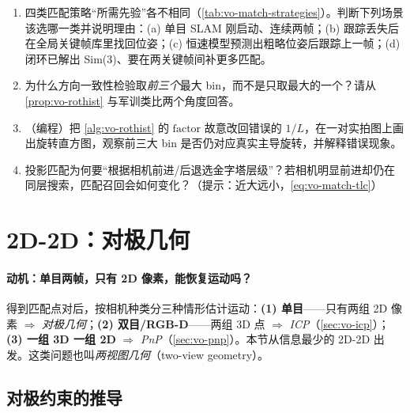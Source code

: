 \begin{practice}
\begin{enumerate}
  \item 四类匹配策略“所需先验”各不相同（\cref{tab:vo-match-strategies}）。判断下列场景该选哪一类并说明理由：(a) 单目 SLAM 刚启动、连续两帧；(b) 跟踪丢失后在全局关键帧库里找回位姿；(c) 恒速模型预测出粗略位姿后跟踪上一帧；(d) 闭环已解出 Sim(3)、要在两关键帧间补更多匹配。
  \item 为什么方向一致性检验取\emph{前三个}最大 bin，而不是只取最大的一个？请从 \cref{prop:vo-rothist} 与军训类比两个角度回答。
  \item （编程）把 \cref{alg:vo-rothist} 的 $\mathrm{factor}$ 故意改回错误的 $1/L$，在一对实拍图上画出旋转直方图，观察前三大 bin 是否仍对应真实主导旋转，并解释错误现象。
  \item 投影匹配为何要“根据相机前进/后退选金字塔层级”？若相机明显前进却仍在同层搜索，匹配召回会如何变化？（提示：近大远小，\cref{eq:vo-match-tlc}）
\end{enumerate}
\end{practice}

\section{2D-2D：对极几何}
\label{sec:vo-epipolar}

\paragraph{动机：单目两帧，只有 2D 像素，能恢复运动吗？}
得到匹配点对后，按相机种类分三种情形估计运动\cite{gaoxiang2019slam14}：\textbf{(1) 单目}——只有两组 2D 像素 $\Rightarrow$ \emph{对极几何}；\textbf{(2) 双目/RGB-D}——两组 3D 点 $\Rightarrow$ \emph{ICP}（\cref{sec:vo-icp}）；\textbf{(3) 一组 3D 一组 2D} $\Rightarrow$ \emph{PnP}（\cref{sec:vo-pnp}）。本节从信息最少的 2D-2D 出发。这类问题也叫\emph{两视图几何}（two-view geometry）。

\subsection{对极约束的推导}
\label{sec:vo-epi-constraint}

